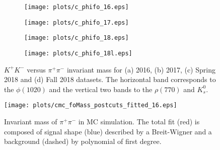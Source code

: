 \begin{figure}[H]
    \centering
    \begin{subfigure}[b]{0.49\textwidth}
        \texttt{[image: plots/c\_phifo\_16.eps]}
        \caption{}
        \label{fig.y2175.xsec_ul.phifo.1.a}
    \end{subfigure}
    \begin{subfigure}[b]{0.49\textwidth}
        \texttt{[image: plots/c\_phifo\_17.eps]}
        \caption{}
        \label{fig.y2175.xsec_ul.phifo.1.b}
    \end{subfigure}
    \begin{subfigure}[b]{0.49\textwidth}
        \texttt{[image: plots/c\_phifo\_18.eps]}
        \caption{}
        \label{fig.y2175.xsec_ul.phifo.1.c}
    \end{subfigure}
    \begin{subfigure}[b]{0.49\textwidth}
        \texttt{[image: plots/c\_phifo\_18l.eps]}
        \caption{}
        \label{fig.y2175.xsec_ul.phifo.1.d}
    \end{subfigure}
    \caption{$K^{+}K^{-}$ versus $\pi^+ \pi^-$ invariant mass for (a) 2016, (b) 2017, (c) Spring 2018 and (d) Fall 2018 datasets. The horizontal band corresponds to the $\phi(1020)$ and the vertical two bands to the $\rho(770)$ and $K_{s}^{0}$.}
    \label{fig.y2175.xsec_ul.phifo.1}
\end{figure}

\begin{figure}[H]
    \centering
    \texttt{[image: plots/cmc\_foMass\_postcuts\_fitted\_16.eps]}
    \caption{\label{fig.y2175.xsec_ul.phifo.2}Invariant mass of $\pi^+ \pi^-$ in MC simulation. The total fit (red) is composed of signal shape (blue) described by a Breit-Wigner and a background (dashed) by polynomial of first degree.}
\end{figure}

